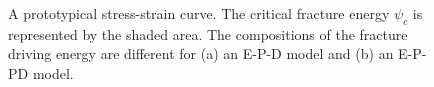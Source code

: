 \begin{figure}[htb!]
\begin{subfigure}{0.4\textwidth}
    \caption{}
    \label{fig: Chapter5/terminology/EPPD}
  \end{subfigure}
  \caption{A prototypical stress-strain curve. The critical fracture energy $\psi_c$ is represented by the shaded area. The compositions of the fracture driving energy are different for (a) an E-P-D model and (b) an E-P-PD model.}
  \label{fig: Chapter5/terminology}
\end{figure}
